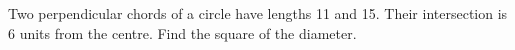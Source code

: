 Two perpendicular chords of a circle have lengths 11 and 15. Their intersection is 6 units from the centre. Find the square of the diameter.
